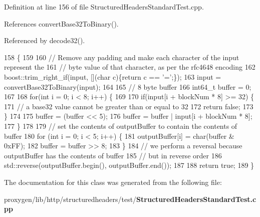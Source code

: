 Definition at line 156 of file Structured\+Headers\+Standard\+Test.\+cpp.



References convert\+Base32\+To\+Binary().



Referenced by decode32().


\begin{DoxyCode}
158                                               \{
159 
160     \textcolor{comment}{// Remove any padding and make each character of the input represent the}
161     \textcolor{comment}{// byte value of that character, as per the rfc4648 encoding}
162     boost::trim\_right\_if(input, [](\textcolor{keywordtype}{char} c)\{\textcolor{keywordflow}{return} c == \textcolor{charliteral}{'='};\});
163     input = convertBase32ToBinary(input);
164 
165     \textcolor{comment}{// 8 byte buffer}
166     int64\_t buffer = 0;
167 
168     \textcolor{keywordflow}{for}(\textcolor{keywordtype}{int} i = 0; i < 8; i++) \{
169 
170       \textcolor{keywordflow}{if}(input[i + blockNum * 8] >= 32) \{
171         \textcolor{comment}{// a base32 value cannot be greater than or equal to 32}
172         \textcolor{keywordflow}{return} \textcolor{keyword}{false};
173       \}
174 
175       buffer = (buffer << 5);
176       buffer = buffer | input[i + blockNum * 8];
177     \}
178 
179     \textcolor{comment}{// set the contents of outputBuffer to contain the contents of buffer}
180     \textcolor{keywordflow}{for} (\textcolor{keywordtype}{int} i = 0; i < 5; i++) \{
181       outputBuffer[i] = char(buffer & 0xFF);
182       buffer = buffer >> 8;
183     \}
184     \textcolor{comment}{// we perform a reversal because outputBuffer has the contents of buffer}
185     \textcolor{comment}{// but in reverse order}
186     std::reverse(outputBuffer.begin(), outputBuffer.end());
187 
188     \textcolor{keywordflow}{return} \textcolor{keyword}{true};
189   \}
\end{DoxyCode}


The documentation for this class was generated from the following file\+:\begin{DoxyCompactItemize}
\item 
proxygen/lib/http/structuredheaders/test/{\bf Structured\+Headers\+Standard\+Test.\+cpp}\end{DoxyCompactItemize}
